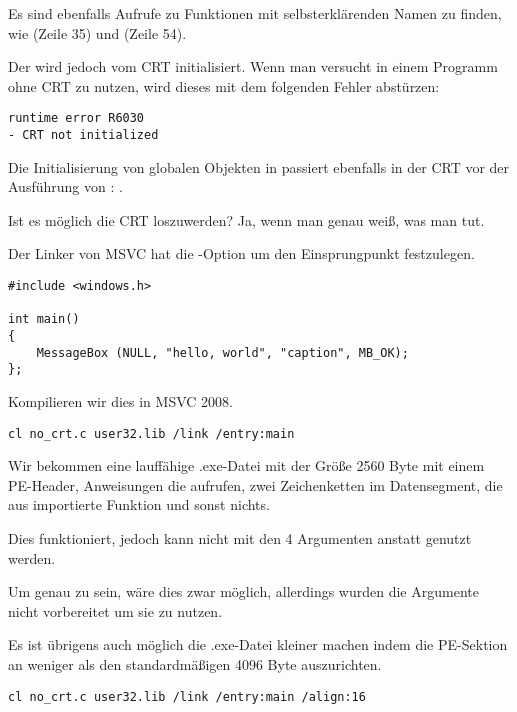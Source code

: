 Es sind ebenfalls Aufrufe zu Funktionen mit selbsterklärenden Namen zu finden, wie 
(Zeile 35) und  (Zeile 54).

Der  wird jedoch vom \ac{CRT} initialisiert.
Wenn man versucht  in einem Programm ohne CRT zu nutzen, wird dieses mit dem folgenden
Fehler abstürzen:

\begin{lstlisting}
runtime error R6030
- CRT not initialized
\end{lstlisting}

Die Initialisierung von globalen Objekten in \Cpp passiert ebenfalls in der \ac{CRT} vor der
Ausführung von \main{}:
.


Ist es möglich die \ac{CRT} loszuwerden?
Ja, wenn man genau weiß, was man tut.

Der Linker von \ac{MSVC} hat die -Option um den Einsprungpunkt festzulegen.

\begin{lstlisting}
#include <windows.h>

int main()
{
	MessageBox (NULL, "hello, world", "caption", MB_OK);
};
\end{lstlisting}

Kompilieren wir dies in MSVC 2008.

\begin{lstlisting}
cl no_crt.c user32.lib /link /entry:main
\end{lstlisting}

Wir bekommen eine lauffähige .exe-Datei mit der Größe 2560 Byte mit einem PE-Header,
Anweisungen die  aufrufen, zwei Zeichenketten im Datensegment, die aus
 importierte Funktion  und sonst nichts.

Dies funktioniert, jedoch kann nicht  mit den 4 Argumenten anstatt \main{}
genutzt werden.

Um genau zu sein, wäre dies zwar möglich, allerdings wurden die Argumente nicht vorbereitet
um sie zu nutzen.

Es ist übrigens auch möglich die .exe-Datei kleiner machen indem die \ac{PE}-Sektion
an weniger als den standardmäßigen 4096 Byte auszurichten.

\begin{lstlisting}
cl no_crt.c user32.lib /link /entry:main /align:16
\end{lstlisting}

